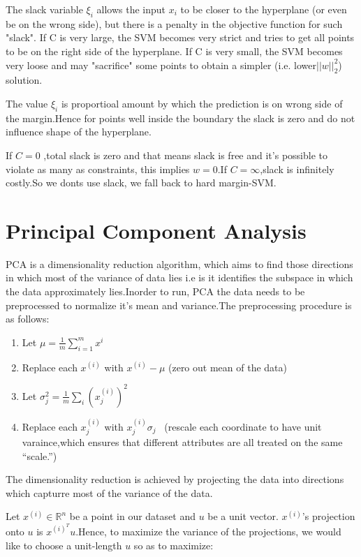 \documentclass[12pt]{article}
\begin{document}
 The slack variable $\xi_{i}$ allows the input $x_{i}$ to be closer to the hyperplane (or even be on the wrong side), but there is a penalty in the objective function for such "slack". If C is very large, the SVM becomes very strict and tries to get all points to be on the right side of the hyperplane. If C is very small, the SVM becomes very loose and may "sacrifice" some points to obtain a simpler (i.e. lower$ \vert \vert w \vert \vert_{2} ^{2}$) solution. 
 
 The value $\xi_{i}$ is proportioal amount by which the prediction is on wrong side of the margin.Hence for points well inside the boundary the slack is zero and do not influence shape of the hyperplane.
 
 If $C =0 $ ,total slack is zero and that means slack is free and it's possible to violate as many as constraints, this implies $w = 0$.If $C = \infty$,slack is infinitely costly.So we donts use slack, we fall back to hard margin-SVM. 
 
 \section{Principal Component Analysis}
PCA is a dimensionality reduction algorithm, which aims to find those directions in which most of the variance of data lies i.e is it  identifies the subspace in which the data approximately lies.Inorder to run, PCA the data needs to be preprocessed to normalize it's mean and variance.The preprocessing procedure is as follows:

\begin{enumerate}
	\item Let $\mu  = \frac{1}{m} \sum_{i=1}^{m}x^{i}$
	\item Replace each $x^{(i)}$ with $x^{(i)}-\mu$ (zero out mean of the data)
	\item Let $\sigma _{j}^{2} = \frac{1}{m} \sum_{i}(x_{j}^{(i)})^{2}$
	\item  Replace each $x_{j}^{(i)}$ with $x_{j}^{(i)} \sigma_{j}$ \ (rescale each coordinate to have unit varaince,which ensures that different attributes are all treated on the same
	“scale.”)
\end{enumerate}

The dimensionality reduction is achieved by projecting the data into directions which capturre most of the variance of the data.

Let $x^{(i)} \in \mathbb{R}^{n}$ be a point in our dataset and $u$ be a unit vector. $x^{(i)}$'s projection onto $u$ is $x^{(i)^T}u$.Hence, to maximize the variance of the projections, we would like to choose a unit-length $u$ so as to maximize:
 
\end{document}
